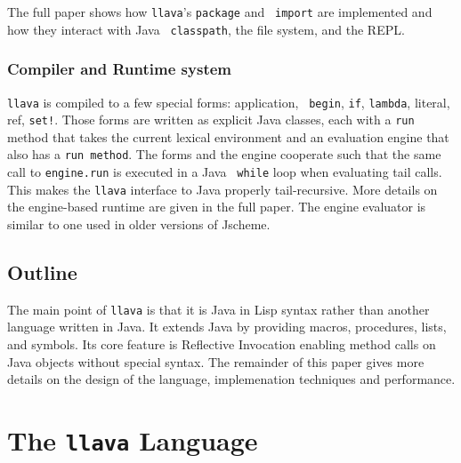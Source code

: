 \documentclass{acm-final/sig-alternate-modified}
\begin{document}

The full paper shows how {\tt llava}'s {\tt package} and {\tt
import} are implemented and how they interact with Java {\tt
classpath}, the file system, and the REPL.


\subsubsection{Compiler and Runtime system}

{\tt llava} is compiled to a few special forms: application, {\tt
begin}, {\tt if}, {\tt lambda}, literal, ref, {\tt set!}.  Those forms
are written as explicit Java classes, each with a {\tt run} method
that takes the current lexical environment and an evaluation engine
that also has a {\tt run method}.  The forms and the engine cooperate
such that the same call to {\tt engine.run} is executed in a Java {\tt
while} loop when evaluating tail calls.  This makes the {\tt llava}
interface to Java properly tail-recursive.  More details on the
engine-based runtime are given in the full paper.  The engine
evaluator is similar to one used in older versions of Jscheme.

\subsection{Outline}

The main point of {\tt llava} is that it is Java in Lisp syntax rather
than another language written in Java.  It extends Java by providing
macros, procedures, lists, and symbols.  Its core feature is
Reflective Invocation enabling method calls on Java objects without
special syntax.  The remainder of this paper gives more details on the
design of the language, implemenation techniques and performance.

\section{The {\tt llava} Language}
\end{document}
